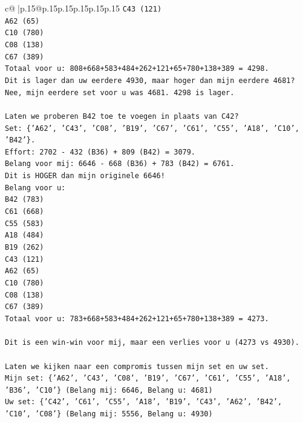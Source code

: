\documentclass{article}
\begin{document}
{\begin{supertabular}{c@{$\;$}|p{.15\linewidth}@{}p{.15\linewidth}p{.15\linewidth}p{.15\linewidth}p{.15\linewidth}p{.15\linewidth}}
{{{\texttt{C43 (121)} \\
\texttt{A62 (65)} \\
\texttt{C10 (780)} \\
\texttt{C08 (138)} \\
\texttt{C67 (389)} \\
\texttt{Totaal voor u: 808+668+583+484+262+121+65+780+138+389 = 4298.} \\
\texttt{Dit is lager dan uw eerdere 4930, maar hoger dan mijn eerdere 4681? Nee, mijn eerdere set voor u was 4681. 4298 is lager.} \\
\\ 
\texttt{Laten we proberen B42 toe te voegen in plaats van C42?} \\
\texttt{Set: \{'A62', 'C43', 'C08', 'B19', 'C67', 'C61', 'C55', 'A18', 'C10', 'B42'\}.} \\
\texttt{Effort: 2702 {-} 432 (B36) + 809 (B42) = 3079.} \\
\texttt{Belang voor mij: 6646 {-} 668 (B36) + 783 (B42) = 6761.} \\
\texttt{Dit is HOGER dan mijn originele 6646!} \\
\texttt{Belang voor u:} \\
\texttt{B42 (783)} \\
\texttt{C61 (668)} \\
\texttt{C55 (583)} \\
\texttt{A18 (484)} \\
\texttt{B19 (262)} \\
\texttt{C43 (121)} \\
\texttt{A62 (65)} \\
\texttt{C10 (780)} \\
\texttt{C08 (138)} \\
\texttt{C67 (389)} \\
\texttt{Totaal voor u: 783+668+583+484+262+121+65+780+138+389 = 4273.} \\
\\ 
\texttt{Dit is een win{-}win voor mij, maar een verlies voor u (4273 vs 4930).} \\
\\ 
\texttt{Laten we kijken naar een compromis tussen mijn set en uw set.} \\
\texttt{Mijn set: \{'A62', 'C43', 'C08', 'B19', 'C67', 'C61', 'C55', 'A18', 'B36', 'C10'\} (Belang mij: 6646, Belang u: 4681)} \\
\texttt{Uw set: \{'C42', 'C61', 'C55', 'A18', 'B19', 'C43', 'A62', 'B42', 'C10', 'C08'\} (Belang mij: 5556, Belang u: 4930)} \\
}}}
\end{supertabular}}
\end{document}
